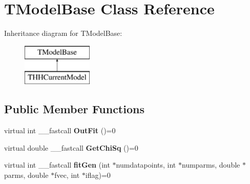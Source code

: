 \hypertarget{class_t_model_base}{\section{T\+Model\+Base Class Reference}
\label{class_t_model_base}
}
Inheritance diagram for T\+Model\+Base\+:\begin{figure}[H]
\begin{center}
\leavevmode
\includegraphics[height=2.000000cm]{class_t_model_base}
\end{center}
\end{figure}
\subsection*{Public Member Functions}
\begin{DoxyCompactItemize}
\item 
\hypertarget{class_t_model_base_aad916cbf9c170e09088b497bea71fd85}{virtual int \+\_\+\+\_\+fastcall {\bfseries Out\+Fit} ()=0}\label{class_t_model_base_aad916cbf9c170e09088b497bea71fd85}

\item 
\hypertarget{class_t_model_base_a43338827724d2585caadbd664adbf7fa}{virtual double \+\_\+\+\_\+fastcall {\bfseries Get\+Chi\+Sq} ()=0}\label{class_t_model_base_a43338827724d2585caadbd664adbf7fa}

\item 
\hypertarget{class_t_model_base_add4c311a969dbf5c2b1f1d5c4c72bb24}{virtual int \+\_\+\+\_\+fastcall {\bfseries fit\+Gen} (int $\ast$numdatapoints, int $\ast$numparms, double $\ast$parms, double $\ast$fvec, int $\ast$iflag)=0}\label{class_t_model_base_add4c311a969dbf5c2b1f1d5c4c72bb24}

\end{DoxyCompactItemize}
